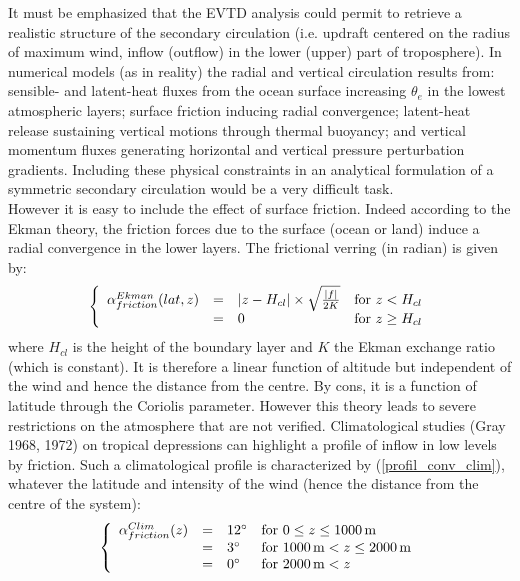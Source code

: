 It must be emphasized that the EVTD analysis could permit to retrieve a realistic structure of the secondary circulation (i.e. updraft centered on the radius of maximum wind, inflow (outflow) in the lower (upper) part of troposphere). In  
numerical models (as in reality) the radial and vertical circulation results from: 
sensible- and latent-heat fluxes from the ocean surface increasing $\theta_{e}$ in 
the lowest atmospheric layers; surface friction inducing radial convergence; 
latent-heat release sustaining vertical motions through thermal buoyancy; and 
vertical momentum fluxes generating horizontal and vertical pressure perturbation 
gradients. Including these physical constraints in an analytical formulation of a 
symmetric secondary circulation would be a very difficult task.\\
However it is easy to include the effect of surface friction. Indeed according to the Ekman theory, the friction forces due to the surface (ocean or land) induce a radial convergence in the lower layers. The frictional verring (in radian) is given by:
\begin{equation}
\left \lbrace
\begin{array}{c c l c}
\label{eq_ekman}
\alpha^{Ekman}_{friction}(lat,z) &=& | z-H_{cl} |\times \sqrt{ \frac {|f|}{2K}} & \mbox{for} \ z<H_{cl}\\
&=& 0 & \mbox{for} \ z \geq H_{cl}\\
\end{array}
\right .
\end{equation}
where $H_{cl}$ is the height of the boundary layer and $K$ the Ekman exchange ratio (which is constant). It is therefore a linear function of altitude but independent of the wind and hence the distance from the centre. By cons, it is a function of latitude through the Coriolis parameter. However this theory leads to severe restrictions on the atmosphere that are not verified.
Climatological studies (Gray 1968, 1972) on tropical depressions can highlight a profile of inflow in low levels by friction. Such a climatological profile is characterized by (\ref{profil_conv_clim}), whatever the latitude and intensity of the wind (hence the distance from the centre of the system):
\begin{equation}
\left \lbrace
\begin{array}{c c l l}
\label{profil_conv_clim}
\alpha^{Clim}_{friction}(z) &=& 12^{\circ} & \mbox{for} \ 0 \leq z \leq 1000\,\mbox{m}\\
&=& 3^{\circ} & \mbox{for} \ 1000\,\mbox{m} <z \leq 2000\,\mbox{m}\\
&=& 0^{\circ} & \mbox{for} \ 2000\,\mbox{m} <z \\
\end{array}
\right .
\end{equation}
